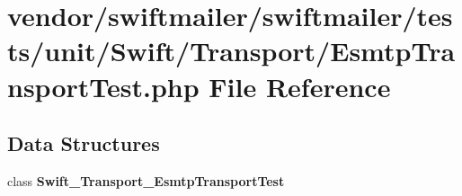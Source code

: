 \section{vendor/swiftmailer/swiftmailer/tests/unit/\+Swift/\+Transport/\+Esmtp\+Transport\+Test.php File Reference}
\label{_esmtp_transport_test_8php}
\subsection*{Data Structures}
\begin{DoxyCompactItemize}
\item 
class {\bf Swift\+\_\+\+Transport\+\_\+\+Esmtp\+Transport\+Test}
\end{DoxyCompactItemize}
